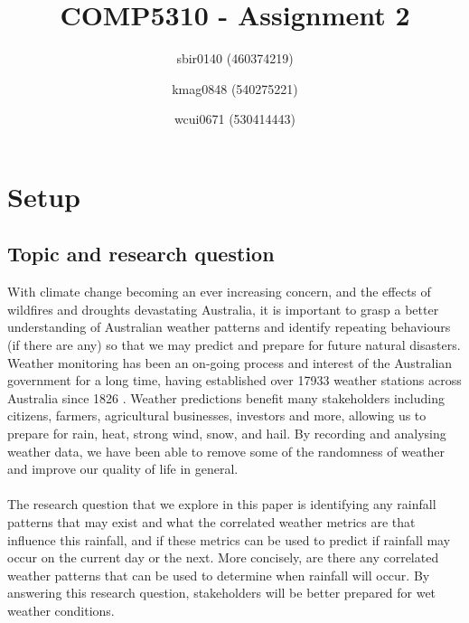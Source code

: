 \documentclass[10pt]{article}
\title{COMP5310 - Assignment 2}
\author{
  sbir0140 (460374219)
  \and
  kmag0848 (540275221)
  \and
  wcui0671 (530414443)
}
\begin{document}
\maketitle

\section{Setup}
\subsection{Topic and research question}
With climate change becoming an ever increasing concern, and the effects of wildfires and droughts devastating Australia, it is important to grasp a better understanding of Australian weather patterns and identify repeating behaviours (if there are any) so that we may predict and prepare for future natural disasters. Weather monitoring has been an on-going process and interest of the Australian government for a long time, having established over 17933 weather stations across Australia since 1826 \cite{bom_weather}. Weather predictions benefit many stakeholders including citizens, farmers, agricultural businesses, investors and more, allowing us to prepare for rain, heat, strong wind, snow, and hail. By recording and analysing weather data, we have been able to remove some of the randomness of weather and improve our quality of life in general.
\\\\
The research question that we explore in this paper is identifying any rainfall patterns that may exist and what the correlated weather metrics are that influence this rainfall, and if these metrics can be used to predict if rainfall may occur on the current day or the next. More concisely, are there any correlated weather patterns that can be used to determine when rainfall will occur. By answering this research question, stakeholders will be better prepared for wet weather conditions.
\end{document}
